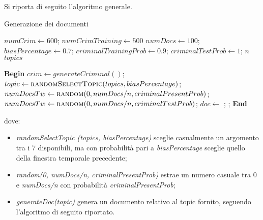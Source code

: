 Si riporta di seguito l'algoritmo generale.
\footnotesize
\begin{algorithm}[H]
\caption{Generazione dei documenti}
\begin{algorithmic}

	\State $numCrim\gets 600$;	
	\State $numCrimTraining\gets 500$ 
	\State $numDocs\gets 100$;	
	\State $biasPercentage\gets 0.7$;	
	\State $criminalTrainingProb\gets 0.9$;	
	\State $criminalTestProb\gets 1$;	
	\State $n$	
	\State $topics$ 
 	
 	\vspace*{+1cm}
 	
	\State \textbf{Begin}
		\State $crim\gets generateCriminal()$;
		\State $topic \gets \Call{randomSelectTopic}{topics, biasPercentage}$; 
			\State $numDocsTw \gets \Call{random}{0, numDocs/n, criminalPresentProb}$; 
		\Else
			\State $numDocsTw \gets \Call{random}{0, numDocs/n, criminalTestProb}$;
		\EndIf
				\State $doc\gets$ ;
				\State {};
			\EndFor
		\EndFor 
	\EndFor
	\State \textbf{End}
\end{algorithmic}
\end{algorithm}
\newpage
\normalsize
dove:
\begin{itemize}
	\item \emph{randomSelectTopic (topics, biasPercentage)} sceglie casualmente un argomento tra i 7 disponibili, ma con probabilità pari a \emph{biasPercentage} sceglie quello della finestra temporale precedente;
	\item \emph{random(0, numDocs/n, criminalPresentProb)} estrae un numero casuale tra 0 e \emph{numDocs/n} con probabilità \emph{criminalPresentProb};
	\item \emph{generateDoc(topic)} genera un documento relativo al topic fornito, seguendo l'algoritmo di seguito riportato.
\end{itemize}

